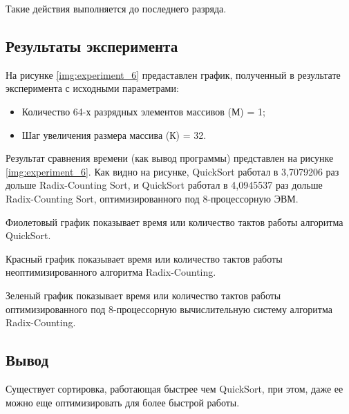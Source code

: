 Такие действия выполняется до последнего разряда.

\subsection*{\textbf{Результаты эксперимента}}
На рисунке \ref{img:experiment_6} предаставлен график, полученный в результате эксперимента с исходными параметрами:
\begin{itemize}
	\item Количество 64-х разрядных элементов массивов (М) = 1;
	\item Шаг увеличения размера массива (К) = 32.
\end{itemize}

\begin{figure}[H]
\end{figure}

Результат сравнения времени (как вывод программы) представлен на рисунке \ref{img:experiment_6}. Как видно на рисунке, QuickSort работал в 3,7079206 раз дольше Radix-Counting Sort, и QuickSort работал в 4,0945537 раз дольше Radix-Counting Sort, оптимизированного под 8-процессорную ЭВМ.

Фиолетовый график показывает время или количество тактов работы алгоритма QuickSort. 

Красный график показывает время или количество тактов работы неоптимизированного алгоритма Radix-Counting. 

Зеленый график показывает время или количество тактов работы оптимизированного под 8-процессорную вычислительную систему алгоритма Radix-Counting.

\subsection*{Вывод}
Существует сортировка, работающая быстрее чем QuickSort, при этом, даже ее можно еще оптимизировать для более быстрой работы.